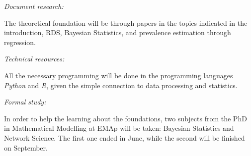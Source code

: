 {\em Document research:}

The theoretical foundation will be through papers in the topics indicated in
the introduction, RDS, Bayesian Statistics, and prevalence estimation through
regression. 

{\em Technical resources:}

All the necessary programming will be done in the programming languages
\textit{Python} and \textit{R}, given the simple connection to data processing
and
statistics. 

{\em Formal study:}

In order to help the learning about the foundations, two subjects from the
PhD in Mathematical Modelling at EMAp will be taken: Bayesian Statistics and
Network Science. The first one ended in June, while the second will be
finished on September.  